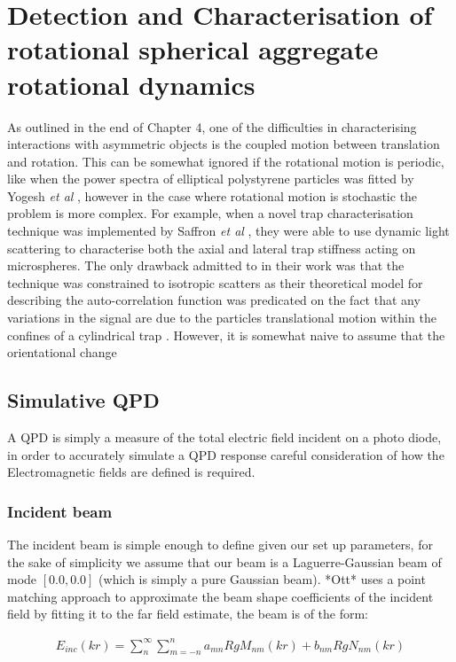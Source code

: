 \chapter{Detection and Characterisation of rotational spherical aggregate rotational dynamics}
\label{chapter:simulated_detection}
As outlined in the end of Chapter 4, one of the difficulties in characterising 
interactions with asymmetric objects is the coupled motion between translation 
and rotation. This can be somewhat ignored if the rotational motion is periodic,
like when the power spectra of elliptical polystyrene particles was fitted by 
Yogesh \textit{et al} \cite{Yogesha2011PreciseCO}, however in the case where 
rotational motion is stochastic the problem is more complex. For example, when a
novel trap characterisation technique was implemented by Saffron \textit{et al}
\cite{BarZiv1997, Meller1998}, they were able to use dynamic light scattering to
characterise both the axial and lateral trap stiffness acting on microspheres. The
only drawback admitted to in their work was that the technique was constrained to
isotropic scatters as their theoretical model for describing the auto-correlation
function was predicated on the fact that any variations in the signal are due to
the particles translational motion within the confines of a cylindrical trap 
\cite{BarZiv1997}. However, it is somewhat naive to assume that the orientational 
change 

 
  
\section{Simulative QPD}
A QPD is simply a measure of the total electric field incident on a photo diode, in order to accurately simulate a QPD response careful consideration of how the Electromagnetic fields are defined is required. 

\subsection{Incident beam}
\label{sec:fibre_scattering}
The incident beam is simple enough to define given our set up parameters, for the sake of simplicity we assume that our beam is a Laguerre-Gaussian beam of mode $[0.0, 0.0]$ (which is simply a pure Gaussian beam). *Ott* uses a point matching approach to approximate the beam shape coefficients of the incident field by fitting it to the far field estimate, the beam is of the form:

\begin{align}
	E_{inc}(kr)=\sum^\infty_n\sum^n_{m=-n}a_{mn}RgM_{nm}(kr)+b_{nm}RgN_{nm}(kr)
\end{align}

